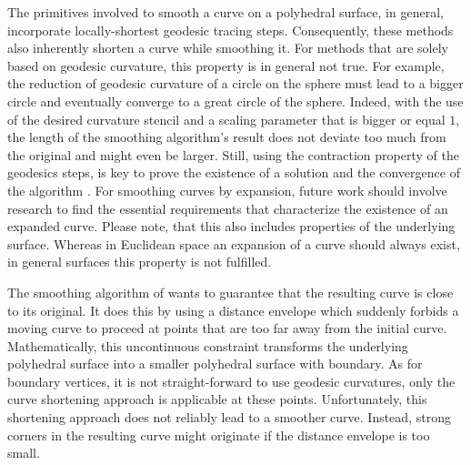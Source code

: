 \documentclass[crop=false]{stdlocal}
\begin{document}
  The primitives involved to smooth a curve on a polyhedral surface, in general, incorporate locally-shortest geodesic tracing steps.
  Consequently, these methods also inherently shorten a curve while smoothing it.
  For methods that are solely based on geodesic curvature, this property is in general not true.
  For example, the reduction of geodesic curvature of a circle on the sphere must lead to a bigger circle and eventually converge to a great circle of the sphere.
  Indeed, with the use of the desired curvature stencil and a scaling parameter that is bigger or equal $1$, the length of the smoothing algorithm's result does not deviate too much from the original and might even be larger.
  Still, using the contraction property of the geodesics steps, is key to prove the existence of a solution and the convergence of the algorithm \autocite{martinez2005,lawonn2014}.
  For smoothing curves by expansion, future work should involve research to find the essential requirements that characterize the existence of an expanded curve.
  Please note, that this also includes properties of the underlying surface.
  Whereas in Euclidean space an expansion of a curve should always exist, in general surfaces this property is not fulfilled.

  The smoothing algorithm of \textcite{lawonn2014} wants to guarantee that the resulting curve is close to its original.
  It does this by using a distance envelope which suddenly forbids a moving curve to proceed at points that are too far away from the initial curve.
  Mathematically, this uncontinuous constraint transforms the underlying polyhedral surface into a smaller polyhedral surface with boundary.
  As for boundary vertices, it is not straight-forward to use geodesic curvatures, only the curve shortening approach is applicable at these points.
  Unfortunately, this shortening approach does not reliably lead to a smoother curve.
  Instead, strong corners in the resulting curve might originate if the distance envelope is too small.
\end{document}

